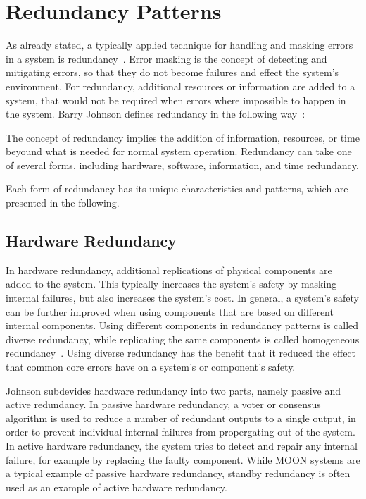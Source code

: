 \section{Redundancy Patterns}
\label{sec:redundancyPatterns}
As already stated, a typically applied technique for handling and masking errors in a system is redundancy~\cite{TanenbaumSteen07}.
Error masking is the concept of detecting and mitigating errors, so that they do not become failures and effect the system's environment.
For redundancy, additional resources or information are added to a system, that would not be required when errors where impossible to happen in the system.
Barry Johnson defines redundancy in the following way~\cite{BarryFaultToleranceAnalysis}:
\begin{definition}
The concept of redundancy implies the addition of information, resources, or time beyound what is needed for normal system operation.
Redundancy can take one of several forms, including hardware, software, information, and time redundancy.
\end{definition}

Each form of redundancy has its unique characteristics and patterns, which are presented in the following.

\subsection{Hardware Redundancy}
In hardware redundancy, additional replications of physical components are added to the system.
This typically increases the system's safety by masking internal failures, but also increases the system's cost.
In general, a system's safety can be further improved when using components that are based on different internal components.
Using different components in redundancy patterns is called diverse redundancy, while replicating the same components is called homogeneous redundancy~\cite{HomogeneousRedundancyOuzineb}.
Using diverse redundancy has the benefit that it reduced the effect that common core errors have on a system's or component's safety.

Johnson subdevides hardware redundancy into two parts, namely passive and active redundancy.
In passive hardware redundancy, a voter or consensus algorithm is used to reduce a number of redundant outputs to a single output, in order to prevent individual internal failures from propergating out of the system.
In active hardware redundancy, the system tries to detect and repair any internal failure, for example by replacing the faulty component.
While \gls*{MOON} systems are a typical example of passive hardware redundancy, standby redundancy is often used as an example of active hardware redundancy.

